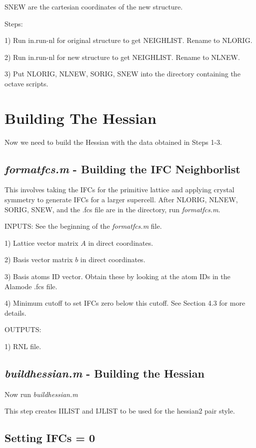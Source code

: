 \documentclass[20pt]{article}
\begin{document}
SNEW are the cartesian coordinates of the new structure. 

Steps:

1) Run in.run-nl for original structure to get NEIGHLIST. Rename to NLORIG.

2) Run in.run-nl for new structure to get NEIGHLIST. Rename to NLNEW.

3) Put NLORIG, NLNEW, SORIG, SNEW into the directory containing the octave scripts.

\section{Building The Hessian}
Now we need to build the Hessian with the data obtained in Steps 1-3.

\subsection{\emph{formatfcs.m} - Building the IFC Neighborlist}

This involves taking the IFCs for the primitive lattice and applying crystal symmetry to generate IFCs for a larger supercell. After NLORIG, NLNEW, SORIG, SNEW, and the .fcs file are in the directory, run \emph{formatfcs.m}.

INPUTS: See the beginning of the \emph{formatfcs.m} file.

1) Lattice vector matrix $A$ in direct coordinates.

2) Basis vector matrix $b$ in direct coordinates.

3) Basis atoms ID vector. Obtain these by looking at the atom IDs in the Alamode .fcs file.

4) Minimum cutoff to set IFCs zero below this cutoff. See Section 4.3 for more details.


OUTPUTS:

1) RNL file.

\subsection{\emph{buildhessian.m} - Building the Hessian}
Now run \emph{buildhessian.m}

This step creates IILIST and IJLIST to be used for the hessian2 pair style.

\subsection{Setting IFCs = 0}
\end{document}
